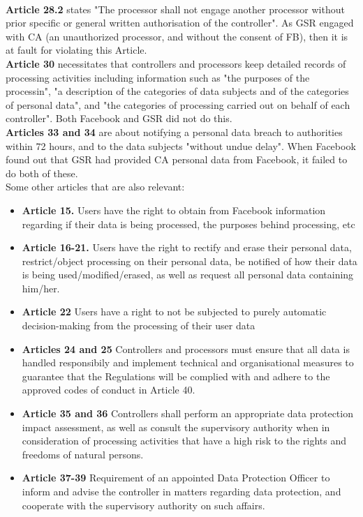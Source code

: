 \documentclass[a4wide, 10pt]{article}
\begin{document}
\vspace{1ex} \\
\textbf{Article 28.2} states "The processor shall not engage another processor without prior specific or general written authorisation of the controller". As GSR engaged with CA (an unauthorized processor, and without the consent of FB), then it is at fault for violating this Article.
\vspace{1ex} \\
\textbf{Article 30} necessitates that controllers and processors keep detailed records of processing activities including information such as "the purposes of the processin", "a description of the categories of data subjects and of the categories of personal data", and "the categories of processing carried out on behalf of each controller". Both Facebook and GSR did not do this.
\vspace{1ex} \\
\textbf{Articles 33 and 34} are about notifying a personal data breach to authorities within 72 hours, and to the data subjects "without undue delay". When Facebook found out that GSR had provided CA personal data from Facebook, it failed to do both of these.
\vspace{1ex} \\
Some other articles that are also relevant:
\begin{itemize}
	\item \textbf{Article 15.} Users have the right to obtain from Facebook information regarding if their data is being processed, the purposes behind processing, etc 
	\item \textbf{Article 16-21.}  Users have the right to rectify and erase their personal data, restrict/object processing on their personal data, be notified of how their data is being used/modified/erased, as well as request all personal data containing him/her.
	\item \textbf{Article 22} Users have a right to not be subjected to purely automatic decision-making from the processing of their user data
	\item \textbf{Articles 24 and 25} Controllers and processors must ensure that all data is handled responsibily and implement technical and organisational measures to guarantee that the Regulations will be complied with and adhere to the approved codes of conduct in Article 40.
	\item \textbf{Article 35 and 36} Controllers shall perform an appropriate data protection impact assessment, as well as consult the supervisory authority when in consideration of processing activities that have a high risk to the rights and freedoms of natural persons.
	\item \textbf{Article 37-39} Requirement of an appointed Data Protection Officer to inform and advise the controller in matters regarding data protection, and cooperate with the supervisory authority on such affairs.

\end{itemize}
\end{document}

